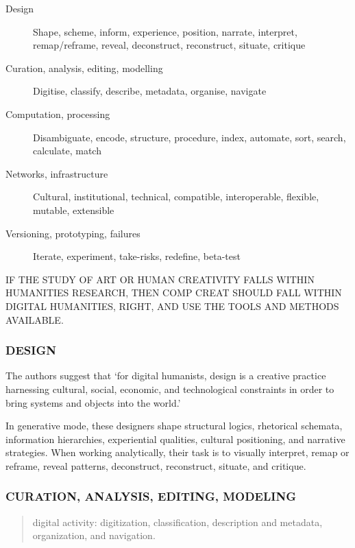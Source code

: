 \begin{draft}
  \begin{description}
    \item [Design] Shape, scheme, inform, experience, position, narrate,
              interpret, remap/reframe, reveal, deconstruct, reconstruct,
              situate, critique
    \item [Curation, analysis, editing, modelling] Digitise, classify, describe, metadata, organise, navigate
    \item [Computation, processing] Disambiguate, encode, structure, procedure, index, automate, sort, search, calculate, match
    \item [Networks, infrastructure] Cultural, institutional, technical, compatible, interoperable, flexible, mutable, extensible
    \item [Versioning, prototyping, failures]	Iterate, experiment, take-risks, redefine, beta-test
  \end{description}

  \begin{draft}
    IF THE STUDY OF ART OR HUMAN CREATIVITY FALLS WITHIN HUMANITIES RESEARCH, THEN COMP CREAT SHOULD FALL WITHIN DIGITAL HUMANITIES, RIGHT, AND USE THE TOOLS AND METHODS AVAILABLE.\@
  \end{draft}

  \subsubsection*{DESIGN}
  The authors suggest that `for digital humanists, design is a creative practice harnessing cultural, social, economic, and technological constraints in order to bring systems and objects into the world.' \autocite[p.13]{Burdick2012}

  In generative mode, these designers shape structural logics, rhetorical schemata, information hierarchies, experiential qualities, cultural positioning, and narrative strategies. When working analytically, their task is to visually interpret, remap or reframe, reveal patterns, deconstruct, reconstruct, situate, and critique. \autocite[p.12]{Burdick2012}

  \subsubsection*{CURATION, ANALYSIS, EDITING, MODELING}
  \begin{quote}
    digital activity: digitization, classification, description and metadata, organization, and navigation. \autocite[p.17]{Burdick2012}
  \end{quote}


\end{draft}
